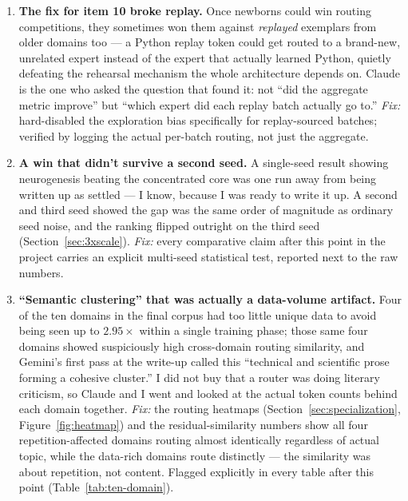 \documentclass[11pt,letterpaper]{article}
\begin{document}
\begin{enumerate}[leftmargin=1.6em,itemsep=0.5em]
\item \textbf{The fix for item 10 broke replay.} Once newborns could win routing competitions, they sometimes won them against \emph{replayed} exemplars from older domains too --- a Python replay token could get routed to a brand-new, unrelated expert instead of the expert that actually learned Python, quietly defeating the rehearsal mechanism the whole architecture depends on. Claude is the one who asked the question that found it: not ``did the aggregate metric improve'' but ``which expert did each replay batch actually go to.'' \emph{Fix:} hard-disabled the exploration bias specifically for replay-sourced batches; verified by logging the actual per-batch routing, not just the aggregate.

\item \textbf{A win that didn't survive a second seed.} A single-seed result showing neurogenesis beating the concentrated core was one run away from being written up as settled --- I know, because I was ready to write it up. A second and third seed showed the gap was the same order of magnitude as ordinary seed noise, and the ranking flipped outright on the third seed (Section~\ref{sec:3xscale}). \emph{Fix:} every comparative claim after this point in the project carries an explicit multi-seed statistical test, reported next to the raw numbers.

\item \textbf{``Semantic clustering'' that was actually a data-volume artifact.} Four of the ten domains in the final corpus had too little unique data to avoid being seen up to $2.95\times$ within a single training phase; those same four domains showed suspiciously high cross-domain routing similarity, and Gemini's first pass at the write-up called this ``technical and scientific prose forming a cohesive cluster.'' I did not buy that a router was doing literary criticism, so Claude and I went and looked at the actual token counts behind each domain together. \emph{Fix:} the routing heatmaps (Section~\ref{sec:specialization}, Figure~\ref{fig:heatmap}) and the residual-similarity numbers show all four repetition-affected domains routing almost identically regardless of actual topic, while the data-rich domains route distinctly --- the similarity was about repetition, not content. Flagged explicitly in every table after this point (Table~\ref{tab:ten-domain}).


\end{enumerate}
\end{document}
